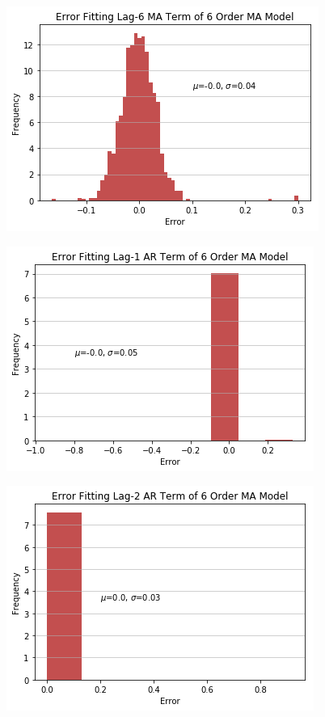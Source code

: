 \documentclass[oneside,12pt,openany]{book}
\begin{document}
	\begin{figure}[!ht]
		\centering
		\includegraphics[width=.85\linewidth]{images/MAModelMALag6CoefDist.png}
	\end{figure}
	\begin{figure}[!ht]
		\centering
		\includegraphics[width=.84\linewidth]{images/MAModelARLag1CoefDist.png}
	\end{figure}
	
	\begin{figure}[!ht]
		\centering
		\includegraphics[width=.84\linewidth]{images/MAModelARLag2CoefDist.png}
	\end{figure}
	
\end{document}

